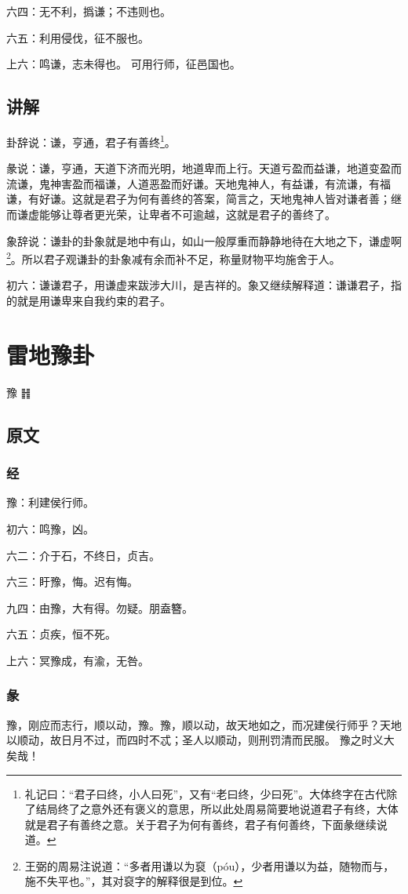 \documentclass[12pt,oneside]{book}
\begin{document}
六四：无不利，撝谦；不违则也。

六五：利用侵伐，征不服也。

上六：鸣谦，志未得也。 可用行师，征邑国也。

\section{讲解}
卦辞说：谦，亨通，君子有善终\footnote{礼记曰：“君子曰终，小人曰死”，又有“老曰终，少曰死”。大体终字在古代除了结局终了之意外还有褒义的意思，所以此处周易简要地说道君子有终，大体就是君子有善终之意。关于君子为何有善终，君子有何善终，下面彖继续说道。}。

彖说：谦，亨通，天道下济而光明，地道卑而上行。天道亏盈而益谦，地道变盈而流谦，鬼神害盈而福谦，人道恶盈而好谦。天地鬼神人，有益谦，有流谦，有福谦，有好谦。这就是君子为何有善终的答案，简言之，天地鬼神人皆对谦者善；继而谦虚能够让尊者更光荣，让卑者不可逾越，这就是君子的善终了。

象辞说：谦卦的卦象就是地中有山，如山一般厚重而静静地待在大地之下，谦虚啊\footnote{王弼的周易注说道：“多者用谦以为裒（póu），少者用谦以为益，随物而与，施不失平也。”，其对裒字的解释很是到位。}。所以君子观谦卦的卦象减有余而补不足，称量财物平均施舍于人。

初六：谦谦君子，用谦虚来跋涉大川，是吉祥的。象又继续解释道：谦谦君子，指的就是用谦卑来自我约束的君子。

\chapter{雷地豫卦}
豫 {\Large ䷏}

\section{原文}

\subsection{经}
豫：利建侯行师。

初六：鸣豫，凶。

六二：介于石，不终日，贞吉。

六三：盱豫，悔。迟有悔。

九四：由豫，大有得。勿疑。朋盍簪。

六五：贞疾，恒不死。

上六：冥豫成，有渝，无咎。

\subsection{彖}
豫，刚应而志行，顺以动，豫。豫，顺以动，故天地如之，而况建侯行师乎？天地以顺动，故日月不过，而四时不忒；圣人以顺动，则刑罚清而民服。 豫之时义大矣哉！
\end{document}
